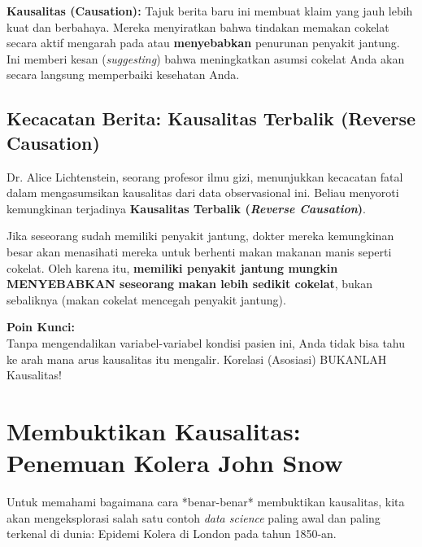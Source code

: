 \documentclass[12pt,a4paper]{article}
\begin{document}
\textbf{Kausalitas (Causation):} Tajuk berita baru ini membuat klaim yang jauh lebih kuat dan berbahaya. Mereka menyiratkan bahwa tindakan memakan cokelat secara aktif mengarah pada atau \textbf{menyebabkan} penurunan penyakit jantung. Ini memberi kesan (\textit{suggesting}) bahwa meningkatkan asumsi cokelat Anda akan secara langsung memperbaiki kesehatan Anda.

\subsection{Kecacatan Berita: Kausalitas Terbalik (Reverse Causation)}
Dr. Alice Lichtenstein, seorang profesor ilmu gizi, menunjukkan kecacatan fatal dalam mengasumsikan kausalitas dari data observasional ini. Beliau menyoroti kemungkinan terjadinya \textbf{Kausalitas Terbalik (\textit{Reverse Causation})}.

Jika seseorang sudah memiliki penyakit jantung, dokter mereka kemungkinan besar akan menasihati mereka untuk berhenti makan makanan manis seperti cokelat. Oleh karena itu, \textbf{memiliki penyakit jantung mungkin MENYEBABKAN seseorang makan lebih sedikit cokelat}, bukan sebaliknya (makan cokelat mencegah penyakit jantung). 

\begin{notebox}
\textbf{Poin Kunci:}\\
Tanpa mengendalikan variabel-variabel kondisi pasien ini, Anda tidak bisa tahu ke arah mana arus kausalitas itu mengalir. Korelasi (Asosiasi) BUKANLAH Kausalitas!
\end{notebox}

\newpage
\section{Membuktikan Kausalitas: Penemuan Kolera John Snow}


Untuk memahami bagaimana cara *benar-benar* membuktikan kausalitas, kita akan mengeksplorasi salah satu contoh \textit{data science} paling awal dan paling terkenal di dunia: Epidemi Kolera di London pada tahun 1850-an.
\end{document}
